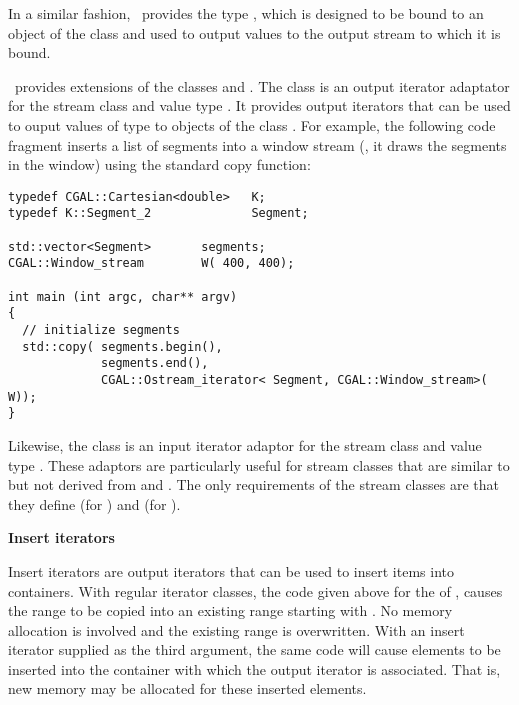 In a similar fashion, \stl\ provides the type , 
which is designed to be bound to an object of the class   
and used to output values to the output stream to which it is bound.

\cgal\ provides extensions of the classes 
and . The class  
is an output iterator adaptator for the stream class  and value 
type .  It provides output iterators that can be used to ouput values 
of type  to objects of the class .
For example, the following code fragment inserts a list of segments into
a window stream (\ie, it draws the segments in the window) using the 
standard copy function: 

\begin{verbatim}
typedef CGAL::Cartesian<double>   K;
typedef K::Segment_2              Segment;

std::vector<Segment>       segments;
CGAL::Window_stream        W( 400, 400);

int main (int argc, char** argv)
{
  // initialize segments
  std::copy( segments.begin(),
             segments.end(),
             CGAL::Ostream_iterator< Segment, CGAL::Window_stream>( W));
}
\end{verbatim}


Likewise, the class  is an input
iterator adaptor for the stream class  and value type . 
These adaptors are particularly useful for stream classes that are similar to
but not derived from  and . The only 
requirements of the stream classes are that they define   
(for ) and  
(for ).

{\bf Insert iterators}

Insert iterators are output iterators that can be used to insert items 
into containers.
With regular iterator classes, the code given above
for the  of \stl, 
causes the range \ccc{[first,last)} to be copied into an existing range 
starting with . No memory allocation is involved and the
existing range is overwritten. With an 
insert iterator supplied as the third argument, the same code will 
cause elements to be inserted into the container with which the output
iterator is associated.  That is, new memory may be allocated for these
inserted elements.

